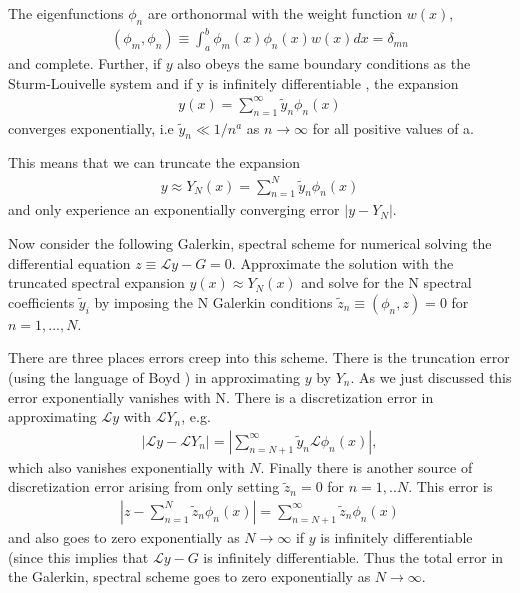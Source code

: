 \documentclass[aps,prd,amsmath,showpacs,amssymb,superscriptaddress,nofootinbib,longbibliography,eqsecnum,preprintnumbers]{revtex4-1}
\begin{document}
The eigenfunctions $\phi_n$ are orthonormal with the weight function $w(x)$,
\begin{align}
(\phi_m,\phi_n)\equiv \int_a^b\phi_m(x)\phi_n(x)w(x)dx =\delta_{mn}
\end{align}
and complete. Further, if $y$ also obeys the same boundary conditions as the Sturm-Louivelle system and if y is infinitely differentiable , the expansion
\begin{align}
y(x)=\sum_{n=1}^\infty \tilde y_n \phi_n(x)
\end{align}
converges exponentially, i.e $\tilde y_n \ll 1/n^a$ as $n\to \infty$ for all positive values of a. 

This means that we can truncate the expansion 
\begin{align}
y\approx Y_N(x)=\sum_{n=1}^N\tilde y_n\phi_n(x)
\end{align}
and only experience an exponentially converging error $|y-Y_N|$.

Now consider the following Galerkin, spectral scheme for numerical solving the differential equation $z\equiv \mathcal L y-G=0$. Approximate the solution with the truncated spectral expansion $y(x)\approx Y_N(x)$ and solve for the N spectral coefficients ${\tilde y_i}$ by imposing the N Galerkin conditions $\tilde z_n\equiv (\phi_n, z)=0$ for $n=1,..., N$. 

There are three places errors creep into this scheme. 
There is the truncation error (using the language of Boyd \cite{Boyd99chebyshevand}) in approximating $y$ by $Y_n$. As we just discussed this error exponentially vanishes with N.
There is a discretization error in approximating $\mathcal L y$ with $\mathcal L Y_n$, e.g.
\begin{align}
|\mathcal L y -\mathcal L Y_n|=\left|\sum_{n=N+1}^\infty \tilde y_n\mathcal L \phi_n(x)\right|,
\end{align}
which also vanishes exponentially with $N$. 
Finally there is another source of discretization error arising from only setting $\tilde z_n =0$ for $n=1,..N$. This error is
\begin{align}
\left|z-\sum_{n=1}^N\tilde z_n \phi_n(x)\right|=\sum_{n=N+1}^\infty \tilde z_n \phi_n(x)
\end{align}
and also goes to zero exponentially as $N\to \infty$ if $y$ is infinitely differentiable (since this implies that $\mathcal{L} y-G$ is infinitely differentiable.
Thus the total error in the Galerkin, spectral scheme goes to zero exponentially as $N\to \infty$.
\end{document}
